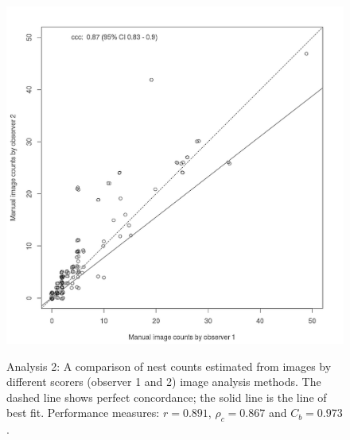 \begin{figure}[!htbp]\myfloatalign
\includegraphics[width=1\linewidth]{gfx6/results/a2} \\
\caption[Manual counts by two scorers.]{Analysis 2: A comparison of nest counts estimated from images by different scorers (observer 1 and 2) image analysis methods. The dashed line shows perfect concordance; the solid line is the line of best fit. Performance measures: $r = 0.891$, $\rho_{c} = 0.867$ and $C_{b} = 0.973$.}\label{fig:manual-image-ob1-ob2-alldata}
\end{figure}

